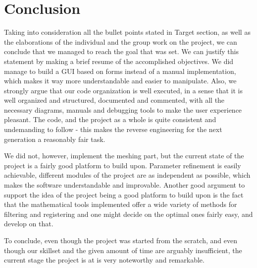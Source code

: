\documentclass[aps,letterpaper,11pt]{revtex4}
\begin{document}
\section{Conclusion}
Taking into consideration all the bullet points stated in Target section, as well as the elaborations of the individual and the group work on the project, we can conclude that we managed to reach the goal that was set. We can justify this statement by making a brief resume of the accomplished objectives. We did manage to build a GUI based on forms instead of a manual implementation, which makes it way more understandable and easier to manipulate. Also, we strongly argue that our code organization is well executed, in a sense that it is well organized and structured, documented and commented, with all the necessary diagrams, manuals and debugging tools to make the user experience pleasant. The code, and the project as a whole is quite consistent and undemanding to follow - this makes the reverse engineering for the next generation a reasonably fair task.\par
We did not, however, implement the meshing part, but the current state of the project is a fairly good platform to build upon. Parameter refinement is easily achievable, different modules of the project are as independent as possible, which makes the software understandable and improvable. Another good argument to support the idea of the project being a good platform to build upon is the fact that the mathematical tools implemented offer a wide variety of methods for filtering and registering and one might decide on the optimal ones fairly easy, and develop on that. \par
To conclude, even though the project was started from the scratch, and even though our skillset and the given amount of time are arguably insufficient, the current stage the project is at is very noteworthy and remarkable. 
\pagebreak
\end{document}
